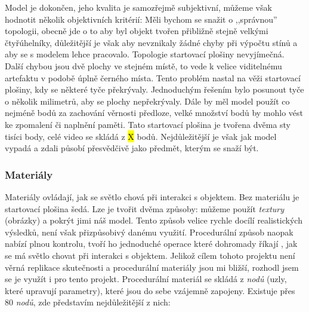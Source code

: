 {Model je dokončen, jeho kvalita je samozřejmě subjektivní, můžeme však hodnotit několik objektivních kritérií:}\odst 
{Měli bychom se snažit o ,,správnou'' topologii, obecně jde o to aby byl objekt tvořen přibližně stejně velkými čtyřúhelníky, důležitější je však aby nevznikaly žádné chyby při výpočtu stínů a aby se s modelem lehce pracovalo. Topologie startovací plošiny nevyjímečná.}\odst
{Další chybou jsou dvě plochy ve stejném místě, to vede k velice viditelnému artefaktu v podobě úplně černého místa. Tento problém nastal na věži startovací plošiny, kdy se některé tyče překrývaly. Jednoduchým řešením bylo posunout tyče o několik milimetrů, aby se plochy nepřekrývaly.}\odst
{Dále by měl model použít co nejméně bodů za zachování věrnosti předloze, velké množství bodů by mohlo vést ke zpomalení či naplnění paměti. Tato startovací plošina je tvořena dvěma sty tisíci body, celé video se skládá z \hl{X} bodů.}\odst
{Nejdůležitější je však jak model vypadá a zdali působí přesvědčivě jako předmět, kterým se snaží být.}

\newpage

\subsubsection{Materiály}
{Materiály ovládají, jak se světlo chová při interakci s objektem. Bez materiálu je startovací plošina šedá.}\odst
{Lze je tvořit dvěma způsoby: můžeme použít \textit{textury} (obrázky) a pokrýt jimi náš model. Tento způsob velice rychle docílí realistických výsledků, není však přizpůsobivý danému využití. Procedurální způsob naopak nabízí plnou kontrolu, tvoří ho jednoduché operace které dohromady říkají , jak se má světlo chovat při interakci s objektem.}\odst
{Jelikož cílem tohoto projektu není věrná replikace skutečnosti a procedurální materiály jsou mi bližší, rozhodl jsem se je využít i pro tento projekt. Procedurální materiál se skládá z \textit{nodů} (uzly, které upravují parametry), které jsou do sebe vzájemně zapojeny. Existuje přes 80 \textit{nodů}, zde představím nejdůležitější z nich:}

